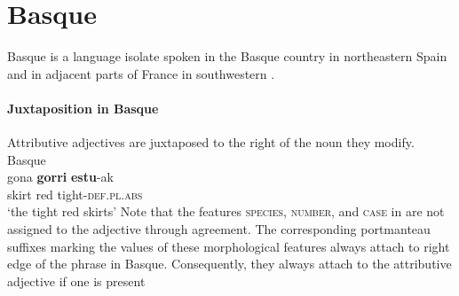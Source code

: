 \section{Basque}
Basque is a language isolate spoken in the Basque country in northeastern Spain and in adjacent parts of France in southwestern . 

\paragraph*{Juxtaposition in Basque}
Attributive adjectives are juxtaposed to the right of the noun they modify.
\ea
\label{basque juxtap}
{\rm Basque \citep[81]{saltarelli1988}}\\
\gll	gona \textbf{gorri} \textbf{estu}-ak\\
	skirt red tight-\textsc{def.pl.abs}\\
\glt	‘the tight red skirts’
\z
Note that the features \textsc{species}, \textsc{number}, and \textsc{case} in  are not assigned to the adjective through agreement. The corresponding portmanteau suffixes marking the values of these morphological features always attach to right edge of the phrase in Basque. Consequently, they always attach to the attributive adjective if one is present \citep[171]{hualde-etal2003}
